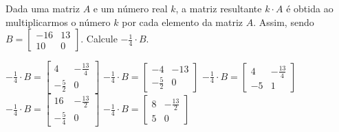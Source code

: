 Dada uma matriz $A$ e um número real $k$, a matriz resultante $k\cdot A$ é obtida ao multiplicarmos o número $k$ por cada elemento da matriz $A$. Assim, sendo $B = \left[ \begin{array}{cc}
-16 & 13\\
10 & 0
\end{array} \right]$. Calcule $-\frac{1}{4}\cdot B$.

$-\frac{1}{4}\cdot B = \left[ \begin{array}{cc} 4 & -\frac{13}{4}\\ -\frac{5}{2} & 0 \end{array} \right]$
$-\frac{1}{4}\cdot B = \left[ \begin{array}{cc} -4 & -13\\ -\frac{5}{2} & 0 \end{array} \right]$
$-\frac{1}{4}\cdot B = \left[ \begin{array}{cc} 4 & -\frac{13}{4}\\ -5 & 1 \end{array} \right]$
$-\frac{1}{4}\cdot B = \left[ \begin{array}{cc} 16 & -\frac{13}{2}\\ -\frac{5}{4} & 0 \end{array} \right]$
$-\frac{1}{4}\cdot B = \left[ \begin{array}{cc} 8 & -\frac{13}{2}\\ 5 & 0 \end{array} \right]$


